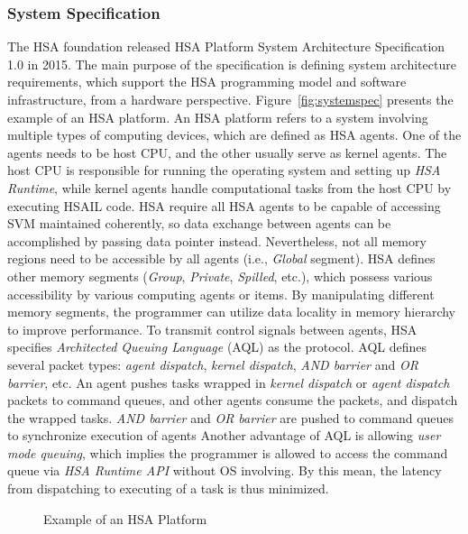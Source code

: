 \documentclass[12pt]{article}
\begin{document}
\begin{CJK}{UTF8}{bkai}
        \subsubsection{System Specification}
        The HSA foundation released HSA Platform System Architecture Specification 1.0 \cite{systemspec} in 2015.
        The main purpose of the specification is defining system architecture requirements, 
        which support the HSA programming model and software infrastructure, from a hardware perspective.
        Figure~\ref{fig:systemspec} presents the example of an HSA platform.
        An HSA platform refers to a system involving multiple types of computing devices, 
        which are defined as HSA agents.
        One of the agents needs to be host CPU, and the other usually serve as kernel agents. 
        The host CPU is responsible for running the operating system and setting up \textit{HSA Runtime},
        while kernel agents handle computational tasks from the host CPU by executing HSAIL code.
        HSA require all HSA agents to be capable of accessing SVM maintained coherently, 
        so data exchange between agents can be accomplished by passing data pointer instead.
        Nevertheless, not all memory regions need to be accessible by all agents (i.e., \textit{Global} segment).
        HSA defines other memory segments (\textit{Group}, \textit{Private}, \textit{Spilled}, etc.), 
        which possess various accessibility by various computing agents or items.
        By manipulating different memory segments, the programmer can utilize data locality in memory hierarchy to improve performance.
        To transmit control signals between agents, HSA specifies \textit{Architected Queuing Language} (AQL) as the protocol. 
        AQL defines several packet types: \textit{agent dispatch}, \textit{kernel dispatch}, \textit{AND barrier} and \textit{OR barrier}, etc.
        An agent pushes tasks wrapped in \textit{kernel dispatch} or \textit{agent dispatch} packets to command queues, 
        and other agents consume the packets, and dispatch the wrapped tasks.
        \textit{AND barrier} and \textit{OR barrier} are pushed to command queues to synchronize execution of agents 
        Another advantage of AQL is allowing \textit{user mode queuing},
        which implies the programmer is allowed to access the command queue via \textit{HSA Runtime API} without OS involving.
        By this mean, the latency from dispatching to executing of a task is thus minimized.
        \begin{figure}[!ht] 
            \caption{Example of an HSA Platform}

\end{figure}
\end{CJK}
\end{document}
